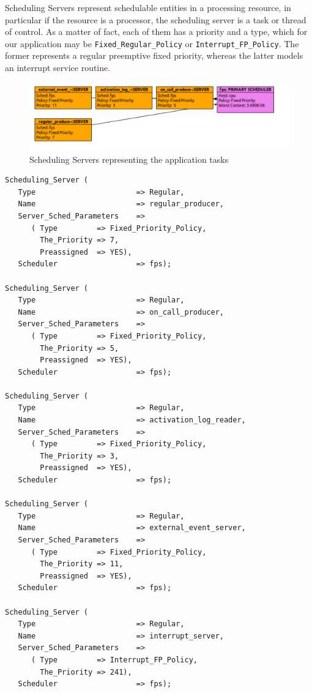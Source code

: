\documentclass{article}
\begin{document}
Scheduling Servers represent schedulable entities in a processing resource, in particular if the resource is a processor, the scheduling server is a task or thread of control. As a matter of fact, each of them has a priority and a type, which for our application may be \texttt{Fixed\_Regular\_Policy} or \texttt{Interrupt\_FP\_Policy}. The former represents a regular preemptive fixed priority, whereas the latter models an interrupt service routine.

\begin{figure}[!htbp]
\centering
\includegraphics[width=6.5in]{images/scheduling-servers}
\caption{Scheduling Servers representing the application tasks}
\label{scheduling-servers}
\end{figure}

\begin{lstlisting}
Scheduling_Server (
   Type                       => Regular,
   Name                       => regular_producer,
   Server_Sched_Parameters    =>
      ( Type         => Fixed_Priority_Policy,
        The_Priority => 7,
        Preassigned  => YES),
   Scheduler                  => fps);

Scheduling_Server (
   Type                       => Regular,
   Name                       => on_call_producer,
   Server_Sched_Parameters    =>
      ( Type         => Fixed_Priority_Policy,
        The_Priority => 5,
        Preassigned  => YES),
   Scheduler                  => fps);

Scheduling_Server (
   Type                       => Regular,
   Name                       => activation_log_reader,
   Server_Sched_Parameters    =>
      ( Type         => Fixed_Priority_Policy,
        The_Priority => 3,
        Preassigned  => YES),
   Scheduler                  => fps);

Scheduling_Server (
   Type                       => Regular,
   Name                       => external_event_server,
   Server_Sched_Parameters    =>
      ( Type         => Fixed_Priority_Policy,
        The_Priority => 11,
        Preassigned  => YES),
   Scheduler                  => fps);

Scheduling_Server (
   Type                       => Regular,
   Name                       => interrupt_server,
   Server_Sched_Parameters    =>
      ( Type         => Interrupt_FP_Policy,
        The_Priority => 241),
   Scheduler                  => fps);
\end{lstlisting}
\end{document}
